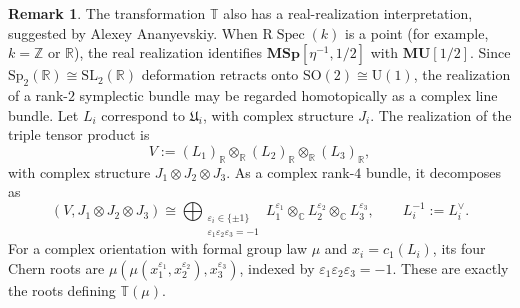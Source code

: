 \documentclass[a4paper]{amsart}
\theoremstyle{plain}
\theoremstyle{definition}
\newtheorem{remark}[subsubsection]{Remark}
\newcommand{\Sp}{\mathrm{Sp}}
\newcommand{\MSp}{\mathbf{MSp}}
\newcommand{\MU}{\mathbf{MU}}
\newcommand{\etainv}{\eta^{-1}}
\newcommand{\ZZ}{\mathbb{Z}}
\begin{document}
\begin{remark}\label{rem:real-realization-of-T}
	The transformation $\mathbb{T}$ also has a real-realization interpretation, suggested by Alexey Ananyevskiy. When $\mathrm{R}\operatorname{Spec}(k)$ is a point (for example, $k=\ZZ$ or $\mathbb{R}$), the real realization identifies $\MSp[\etainv,1/2]$ with $\MU[1/2]$. Since $\Sp_2(\mathbb{R})\cong \mathrm{SL}_2(\mathbb{R})$ deformation retracts onto $\mathrm{SO}(2)\cong \mathrm{U}(1)$, the realization of a rank-$2$ symplectic bundle may be regarded homotopically as a complex line bundle. Let $L_i$ correspond to $\mathfrak{U}_i$, with complex structure $J_i$. The realization of the triple tensor product is
	\[
		V:=(L_1)_{\mathbb{R}}\otimes_{\mathbb{R}}(L_2)_{\mathbb{R}}\otimes_{\mathbb{R}}(L_3)_{\mathbb{R}},
	\]
	with complex structure $J_1\otimes J_2\otimes J_3$. As a complex rank-$4$ bundle, it decomposes as
	\[
		(V,J_1\otimes J_2\otimes J_3)\cong
		\bigoplus_{\substack{\varepsilon_i\in\{\pm1\}\\ \varepsilon_1\varepsilon_2\varepsilon_3=-1}}
		L_1^{\varepsilon_1}\otimes_{\mathbb{C}} L_2^{\varepsilon_2}\otimes_{\mathbb{C}} L_3^{\varepsilon_3},
		\qquad L_i^{-1}:=L_i^\vee.
	\]
	For a complex orientation with formal group law $\mu$ and $x_i=c_1(L_i)$, its four Chern roots are $\mu(\mu(x_1^{\varepsilon_1},x_2^{\varepsilon_2}),x_3^{\varepsilon_3})$, indexed by $\varepsilon_1\varepsilon_2\varepsilon_3=-1$. These are exactly the roots defining $\mathbb{T}(\mu)$.
\end{remark}
\end{document}
